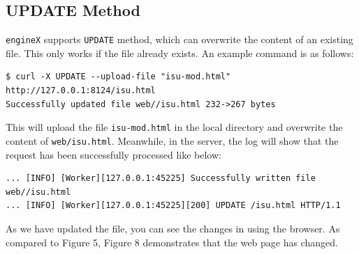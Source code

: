 \documentclass{homework}
\begin{document}

\pagebreak
\subsection{UPDATE Method}
\texttt{engineX} supports \texttt{UPDATE} method, which can overwrite the content of an existing file. This only works if the file already exists. An example command is as follows:
\\
\begin{center}
\begin{code}
\begin{verbatim}
$ curl -X UPDATE --upload-file "isu-mod.html" http://127.0.0.1:8124/isu.html
Successfully updated file web//isu.html 232->267 bytes
\end{verbatim}
\end{code}
\end{center}
This will upload the file \texttt{isu-mod.html} in the local directory and overwrite the content of \texttt{web/isu.html}. Meanwhile, in the server, the log will show that the request has been successfully processed like below:
\\
\begin{center}
\begin{code}
\begin{verbatim}
... [INFO] [Worker][127.0.0.1:45225] Successfully written file web//isu.html
... [INFO] [Worker][127.0.0.1:45225][200] UPDATE /isu.html HTTP/1.1
\end{verbatim}
\end{code}
\end{center}

As we have updated the file, you can see the changes in using the browser. As compared to Figure 5, Figure 8 demonstrates that the web page has changed. 
\end{document}
